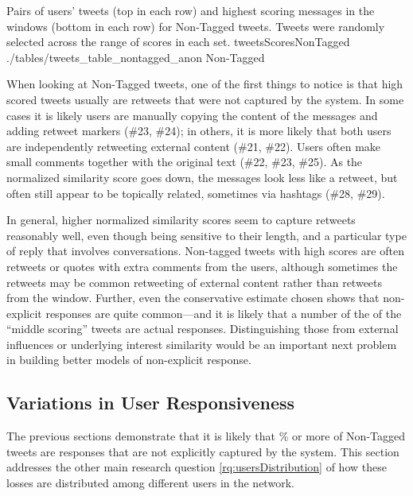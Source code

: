 \tweetTableFull
{Pairs of users' tweets (top in each row) and highest scoring messages in the windows (bottom in each row) for Non-Tagged tweets.  Tweets were randomly selected across the range of scores in each set.}
{tweetsScoresNonTagged}
{./tables/tweets_table_nontagged_anon}
{Non-Tagged}

When looking at Non-Tagged tweets, one of the first things to notice is that high scored tweets usually are retweets that were not captured by the system.  In some cases it is likely users are manually copying the content of the messages and adding retweet markers (\#23, \#24); in others, it is more likely that both users are independently retweeting external content (\#21, \#22).  Users often make small comments together with the original text (\#22, \#23, \#25).  As the normalized similarity score goes down, the messages look less like a retweet, but often still appear to be topically related, sometimes via hashtags (\#28, \#29).  

In general, higher normalized similarity scores seem to capture retweets reasonably well, even though being sensitive to their length, and a particular type of reply that involves conversations.  Non-tagged tweets with high scores are often retweets or quotes with extra comments from the users, although sometimes the retweets may be common retweeting of external content rather than retweets from the window.
Further, even the conservative estimate chosen shows that non-explicit responses are quite common---and it is likely that a number of the of the ``middle scoring'' tweets are actual responses.  Distinguishing those from external influences or underlying interest similarity would be an important next problem in building better models of non-explicit response.  

\subsection{Variations in User Responsiveness}

The previous sections demonstrate that it is likely that \highNonTaggedTweetCountPct{}\% or more of Non-Tagged tweets are responses that are not explicitly captured by the system.  This section addresses the other main research question \ref{rq:usersDistribution} of how these losses are distributed among different users in the network.   

